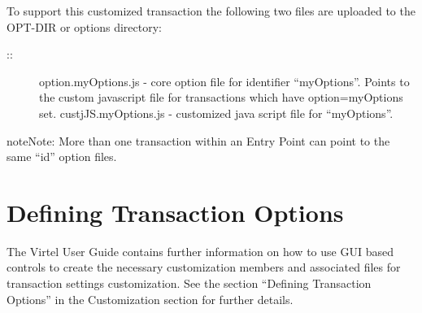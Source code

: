 \documentclass[letterpaper,10pt,english]{sphinxmanual}
\begin{document}
\begin{sphinxVerbatim}[commandchars=\\\{\}]
  
    
  
     

  
  
\end{sphinxVerbatim}


To support this customized transaction the following two files are uploaded to the OPT-DIR or options directory:
\begin{description}
\item[{::}] \leavevmode
option.myOptions.js  - core option file for identifier “myOptions”. Points to the custom javascript file for transactions which have option=myOptions set.
custjJS.myOptions.js - customized java script file for “myOptions”.

\end{description}

\begin{sphinxadmonition}{note}{Note:}
More than one transaction within an Entry Point can point to the same “id” option files.
\end{sphinxadmonition}

\ignorespaces 

\section{Defining Transaction Options}
\label{\detokenize{Customization:defining-transaction-options}}\label{\detokenize{Customization:index-6}}
The Virtel User Guide contains further information on how to use GUI based controls to create the necessary customization members and associated files for transaction settings customization. See the section “Defining Transaction Options” in the Customization section for further details.
\end{document}
